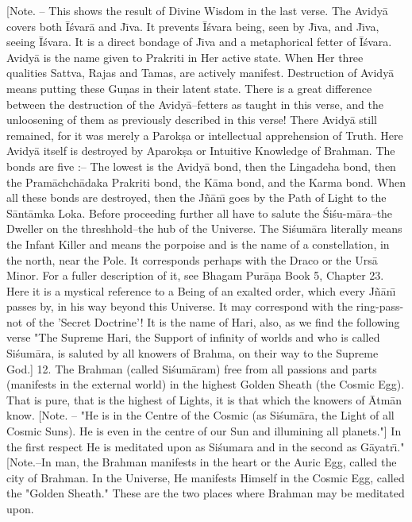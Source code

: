 [Note. -- This shows the result of Divine Wisdom in the last verse. The Avidy\=a covers both \=I\'svar\=a and J\={\i}va. It prevents \=I\'svara being, seen by J\={\i}va, and J\={\i}va, seeing \=I\'svara. It is a direct bondage of J\={\i}va and a metaphorical fetter of \=I\'svara. Avidy\=a is the name given to Prakriti in Her active state. When Her three qualities Sattva, Rajas and Tamas, are actively manifest. Destruction of Avidy\=a means putting these Gu\d{n}as in their latent state. There is a great difference between the destruction of the Avidy\=a--fetters as taught in this verse, and the unloosening of them as previously described in this verse! There Avidy\=a still remained, for it was merely a Parok\d{s}a or intellectual apprehension of Truth. Here Avidy\=a itself is destroyed by Aparok\d{s}a or Intuitive Knowledge of Brahman.
The bonds are five :-- The lowest is the Avidy\=a bond, then the Lingadeha bond, then the Pram\=achch\=adaka Prakriti bond, the K\=ama bond, and the Karma bond. When all these bonds are destroyed, then the J\~n\=an\={\i} goes by the Path of Light to the S\=ant\=amka Loka. Before proceeding further all have to salute the \'Si\'su-m\=ara--the Dweller on the threshhold--the hub of the Universe.
The Si\'sum\=ara literally means the Infant Killer and means the porpoise and is the name of a constellation, in the north, near the Pole. It corresponds perhaps with the Draco or the Urs\=a Minor. For a fuller description of it, see Bhagam Pur\=a\d{n}a Book 5, Chapter 23. Here it is a mystical reference to a Being of an exalted order, which every J\~n\=an\={\i} passes by, in his way beyond this Universe. It may correspond with the ring-pass-not of the 'Secret Doctrine'! It is the name of Hari, also, as we find the following verse "The Supreme Hari, the Support of infinity of worlds and who is called Si\'sum\=ara, is saluted by all knowers of Brahma, on their way to the Supreme God.]
12. The Brahman (called Si\'sum\=aram) free from all passions and parts (manifests in the external world) in the highest Golden Sheath (the Cosmic Egg). That is pure, that is the highest of Lights, it is that which the knowers of \=Atm\=an know. [Note. -- "He is in the Centre of the Cosmic (as Si\'sum\=ara, the Light of all Cosmic Suns). He is even in the centre of our Sun and illumining all planets."]
In the first respect He is meditated upon as Si\'sumara and in the second as G\=ayatr\={\i}." [Note.--In man, the Brahman manifests in the heart or the Auric Egg, called the city of Brahman. In the Universe, He manifests Himself in the Cosmic Egg, called the "Golden Sheath." These are the two places where Brahman may be meditated upon.

